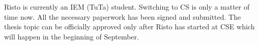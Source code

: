 Risto is currently an IEM (TuTa) student. Switching to CS is only a matter of time now. All the necessary paperwork has been signed and submitted. The thesis topic can be officially approved only after Risto has started at CSE which will happen in the beginning of September.